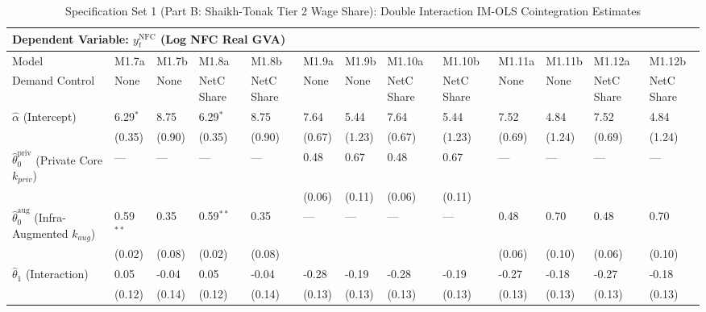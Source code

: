\begin{table}[H]
\centering
\caption{Specification Set 1 (Part B: Shaikh-Tonak Tier 2 Wage Share): Double Interaction IM-OLS Cointegration Estimates}
\label{tab:spec_set_1_b}
\scriptsize
\begin{tabular}{p{3.8cm}p{1.5cm}p{1.5cm}p{1.5cm}p{1.5cm}p{1.5cm}p{1.5cm}p{1.5cm}p{1.5cm}p{1.5cm}p{1.5cm}p{1.5cm}p{1.5cm}}
\toprule
\multicolumn{13}{l}{\textbf{Dependent Variable: $y_t^{\text{NFC}}$ (Log NFC Real GVA)}} \\
\midrule
Model & M1.7a & M1.7b & M1.8a & M1.8b & M1.9a & M1.9b & M1.10a & M1.10b & M1.11a & M1.11b & M1.12a & M1.12b  \\
Demand Control & None & None & NetC Share & NetC Share & None & None & NetC Share & NetC Share & None & None & NetC Share & NetC Share  \\
\midrule
$\hat{\alpha}$ (Intercept)  & 6.29$^{*}$ & 8.75 & 6.29$^{*}$ & 8.75 & 7.64 & 5.44 & 7.64 & 5.44 & 7.52 & 4.84 & 7.52 & 4.84  \\
 & {\scriptsize (0.35)} & {\scriptsize (0.90)} & {\scriptsize (0.35)} & {\scriptsize (0.90)} & {\scriptsize (0.67)} & {\scriptsize (1.23)} & {\scriptsize (0.67)} & {\scriptsize (1.23)} & {\scriptsize (0.69)} & {\scriptsize (1.24)} & {\scriptsize (0.69)} & {\scriptsize (1.24)}  \\
$\hat{\theta}_0^{\text{priv}}$ (Private Core $k_{priv}$)  & --- & --- & --- & --- & 0.48 & 0.67 & 0.48 & 0.67 & --- & --- & --- & ---  \\
 &  &  &  &  & {\scriptsize (0.06)} & {\scriptsize (0.11)} & {\scriptsize (0.06)} & {\scriptsize (0.11)} &  &  &  &   \\
$\hat{\theta}_0^{\text{aug}}$ (Infra-Augmented $k_{aug}$)  & 0.59$^{**}$ & 0.35 & 0.59$^{**}$ & 0.35 & --- & --- & --- & --- & 0.48 & 0.70 & 0.48 & 0.70  \\
 & {\scriptsize (0.02)} & {\scriptsize (0.08)} & {\scriptsize (0.02)} & {\scriptsize (0.08)} &  &  &  &  & {\scriptsize (0.06)} & {\scriptsize (0.10)} & {\scriptsize (0.06)} & {\scriptsize (0.10)}  \\
$\hat{\theta}_1$ (Interaction)  & 0.05 & -0.04 & 0.05 & -0.04 & -0.28 & -0.19 & -0.28 & -0.19 & -0.27 & -0.18 & -0.27 & -0.18  \\
 & {\scriptsize (0.12)} & {\scriptsize (0.14)} & {\scriptsize (0.12)} & {\scriptsize (0.14)} & {\scriptsize (0.13)} & {\scriptsize (0.13)} & {\scriptsize (0.13)} & {\scriptsize (0.13)} & {\scriptsize (0.13)} & {\scriptsize (0.13)} & {\scriptsize (0.13)} & {\scriptsize (0.13)}  \\

\end{tabular}
\end{table}

